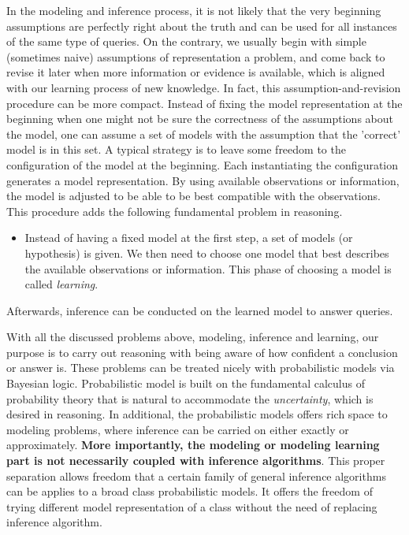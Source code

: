 In the modeling and inference process, it is not likely that the very beginning assumptions are perfectly right about the truth and can be used for all instances of the same type of queries. On the contrary, we usually begin with simple (sometimes naive) assumptions of representation a problem, and come back to revise it later when more information or evidence is available, which is aligned with our learning process of new knowledge. In fact, this assumption-and-revision procedure can be more compact. Instead of fixing the model representation at the beginning when one might not be sure the correctness of the assumptions about the model, one can assume a set of models with the assumption that the 'correct' model is in this set. A typical strategy is to leave some freedom to the configuration of the model at the beginning. Each instantiating the configuration generates a model representation. By using available observations or information, the model is adjusted to be able to be best compatible with the observations. This procedure adds the following fundamental problem in reasoning.
\begin{itemize}
\item Instead of having a fixed model at the first step, a set of models (or hypothesis) is given. We then need to choose one model that best describes the available observations or information. This phase of choosing a model is called \textit{learning}. 
\end{itemize}
Afterwards, inference can be conducted on the learned model to answer queries.

With all the discussed problems above, modeling, inference and learning, our purpose is to carry out reasoning with being aware of how confident a conclusion or answer is. 
These problems can be treated nicely with probabilistic models via Bayesian logic. Probabilistic model is built on the fundamental calculus of probability theory that is natural to accommodate the \textit{uncertainty}, which is desired in reasoning. In additional, the probabilistic models offers rich space to modeling problems, where inference can be carried on either exactly or approximately. \textbf{More importantly, the modeling or modeling learning part is not necessarily coupled with inference algorithms}. This proper separation allows freedom that a certain family of general inference algorithms can be applies to a broad class probabilistic models. It offers the freedom of trying different model representation of a class without the need of replacing inference algorithm. 

